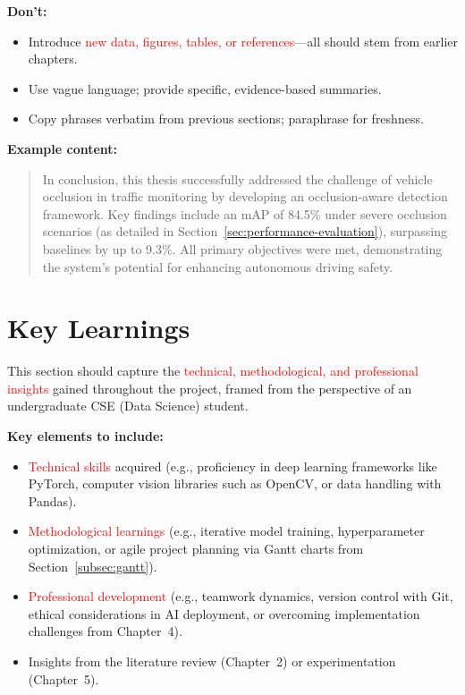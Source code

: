 \documentclass[12pt,a4paper]{report}
\theoremstyle{definition}
\theoremstyle{remark}
\begin{document}
\noindent \textbf{Don’t:}
\begin{itemize}
    \item Introduce \textcolor{red}{new data, figures, tables, or references}—all should stem from earlier chapters.
    \item Use vague language; provide specific, evidence-based summaries.
    \item Copy phrases verbatim from previous sections; paraphrase for freshness.
\end{itemize}

\noindent \textbf{Example content:}
\begin{quote}
    In conclusion, this thesis successfully addressed the challenge of vehicle occlusion in traffic monitoring by developing an occlusion-aware detection framework. Key findings include an mAP of 84.5\% under severe occlusion scenarios (as detailed in Section~\ref{sec:performance-evaluation}), surpassing baselines by up to 9.3\%. All primary objectives were met, demonstrating the system's potential for enhancing autonomous driving safety.
\end{quote}

\section{Key Learnings}
\label{sec:key-learnings}

This section should capture the \textcolor{red}{technical, methodological, and professional insights} gained throughout the project, framed from the perspective of an undergraduate CSE (Data Science) student.

\noindent \textbf{Key elements to include:}
\begin{itemize}
    \item \textcolor{red}{Technical skills} acquired (e.g., proficiency in deep learning frameworks like PyTorch, computer vision libraries such as OpenCV, or data handling with Pandas).
    \item \textcolor{red}{Methodological learnings} (e.g., iterative model training, hyperparameter optimization, or agile project planning via Gantt charts from Section~\ref{subsec:gantt}).
    \item \textcolor{red}{Professional development} (e.g., teamwork dynamics, version control with Git, ethical considerations in AI deployment, or overcoming implementation challenges from Chapter~4).
    \item Insights from the literature review (Chapter~2) or experimentation (Chapter~5).
\end{itemize}
\end{document}
